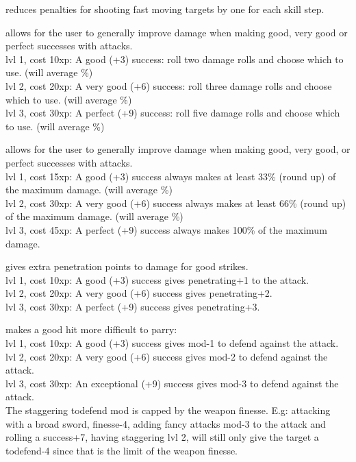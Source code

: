  reduces penalties for shooting fast moving targets by one for each skill step.


 allows for the user to generally improve damage when making good, very good or perfect successes with attacks. \\
lvl 1, cost 10xp: A good (+3) success: roll two damage rolls and choose which to use. (will average \%) \\
lvl 2, cost 20xp: A very good (+6) success: roll three damage rolls and choose which to use. (will average \%) \\
lvl 3, cost 30xp: A perfect (+9) success: roll five damage rolls and choose which to use. (will average \%)


 allows for the user to generally improve damage when making good, very good, or perfect successes with attacks. \\
lvl 1, cost 15xp: A good (+3) success always makes at least 33\% (round up) of the maximum damage. (will average \%) \\
lvl 2, cost 30xp: A very good (+6) success always makes at least 66\% (round up) of the maximum damage. (will average \%) \\
lvl 3, cost 45xp: A perfect (+9) success always makes 100\% of the maximum damage.


 gives extra penetration points to damage for good strikes. \\
lvl 1, cost 10xp: A good (+3) success gives penetrating+1 to the attack. \\
lvl 2, cost 20xp: A very good (+6) success gives penetrating+2. \\
lvl 3, cost 30xp: A perfect (+9) success gives penetrating+3.


 makes a good hit more difficult to parry: \\
lvl 1, cost 10xp: A good (+3) success gives mod-1 to defend against the attack.  \\
lvl 2, cost 20xp: A very good (+6) success gives mod-2 to defend against the attack.  \\
lvl 3, cost 30xp: An exceptional (+9) success gives mod-3 to defend against the attack.  \\

The staggering todefend mod is capped by the weapon finesse. E.g: attacking with a broad sword, finesse-4, adding fancy attacks mod-3 to the attack and rolling a success+7, having staggering lvl 2, will still only give the target a todefend-4 since that is the limit of the weapon finesse.


